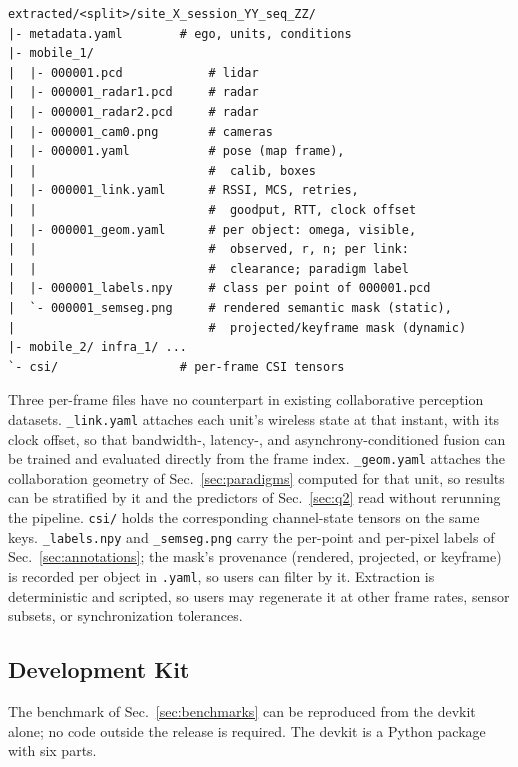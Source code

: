 \documentclass[journal]{IEEEtran}
\begin{document}
{\scriptsize
\begin{verbatim}
extracted/<split>/site_X_session_YY_seq_ZZ/
|- metadata.yaml        # ego, units, conditions
|- mobile_1/
|  |- 000001.pcd            # lidar
|  |- 000001_radar1.pcd     # radar
|  |- 000001_radar2.pcd     # radar
|  |- 000001_cam0.png       # cameras
|  |- 000001.yaml           # pose (map frame),
|  |                        #  calib, boxes
|  |- 000001_link.yaml      # RSSI, MCS, retries,
|  |                        #  goodput, RTT, clock offset
|  |- 000001_geom.yaml      # per object: omega, visible,
|  |                        #  observed, r, n; per link:
|  |                        #  clearance; paradigm label
|  |- 000001_labels.npy     # class per point of 000001.pcd
|  `- 000001_semseg.png     # rendered semantic mask (static),
|                           #  projected/keyframe mask (dynamic)
|- mobile_2/ infra_1/ ...
`- csi/                 # per-frame CSI tensors
\end{verbatim}
}

Three per-frame files have no counterpart in existing collaborative
perception datasets. \texttt{\_link.yaml} attaches each unit's
wireless state at that instant, with its clock offset, so that
bandwidth-, latency-, and asynchrony-conditioned fusion can be trained
and evaluated directly from the frame index. \texttt{\_geom.yaml}
attaches the collaboration geometry of Sec.~\ref{sec:paradigms}
computed for that unit, so results can be stratified by it and the
predictors of Sec.~\ref{sec:q2} read without rerunning the pipeline.
\texttt{csi/} holds the corresponding channel-state tensors on the
same keys. \texttt{\_labels.npy} and \texttt{\_semseg.png} carry the
per-point and per-pixel labels of Sec.~\ref{sec:annotations}; the
mask's provenance (rendered, projected, or keyframe) is recorded per
object in \texttt{.yaml}, so users can filter by it. Extraction is
deterministic and scripted, so users may regenerate it at other frame
rates, sensor subsets, or synchronization tolerances.

\subsection{Development Kit}
\label{sec:devkit}
The benchmark of Sec.~\ref{sec:benchmarks} can be reproduced from the
devkit alone; no code outside the release is required. The devkit is
a Python package with six parts.
\end{document}
